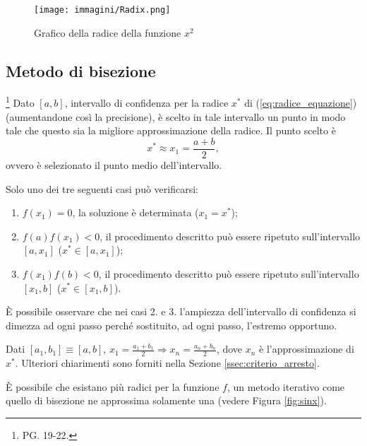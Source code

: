 
\begin{figure}
	\centering
	\texttt{[image: immagini/Radix.png]}
	\caption{\label{fig:SingleRadix}Grafico della radice della funzione $x^2$}
\end{figure}

\subsection{Metodo di bisezione}\footnote{PG. 19-22.}
Dato $[a,b]$, intervallo di confidenza per la radice $x^*$ di (\ref{eq:radice_equazione}) (aumentandone così la
precisione), è scelto in tale intervallo un punto in modo tale che questo sia la migliore approssimazione della radice. Il punto scelto è 
\begin{equation*}
	x^*\approx x_1=\frac{a+b}{2},
\end{equation*}
ovvero è selezionato il punto medio dell'intervallo.

Solo uno dei tre seguenti casi può verificarsi:
\begin{enumerate}
	\item $f(x_1)=0$, la soluzione è determinata ($x_1=x^*$);
	\item $f(a)f(x_1)<0$, il procedimento descritto può essere ripetuto sull'intervallo $[a, x_1]$ ($x^*\in[a, x_1]$);
	\item $f(x_1)f(b)<0$, il procedimento descritto può essere ripetuto sull'intervallo $[x_1, b]$ ($x^*\in[x_1, b]$).
\end{enumerate}

\begin{remark}
	È possibile osservare che nei casi 2. e 3. l'ampiezza dell'intervallo di confidenza si dimezza ad ogni passo perché sostituito, ad ogni passo, l'estremo opportuno.
\end{remark}

\begin{remark}
	Dati $[a_1,b_1]\equiv [a,b],\, x_1=\frac{a_1+b_1}{2}\Rightarrow x_n=\frac{a_n+b_n}{2}$, dove $x_n$ è l'approssimazione di $x^*$. Ulteriori chiarimenti sono forniti nella Sezione \ref{ssec:criterio_arresto}.
\end{remark}

È possibile che esistano più radici per la funzione $f$, un metodo iterativo come quello di bisezione ne approssima solamente una (vedere Figura \ref{fig:sinx}).


